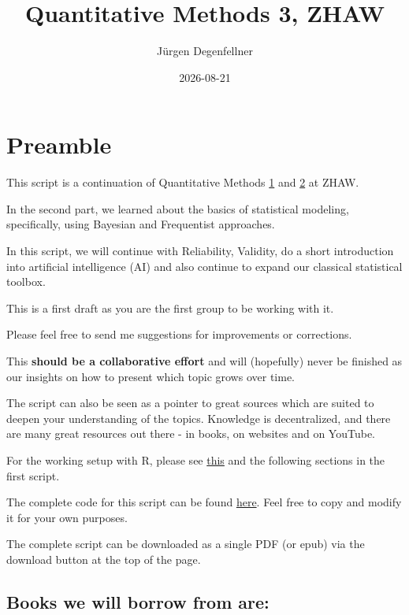 \documentclass[
]{book}
\title{Quantitative Methods 3, ZHAW}
\author{Jürgen Degenfellner}
\date{2026-08-21}
\begin{document}
\maketitle

{
\setcounter{tocdepth}{1}
\tableofcontents
}
\chapter{Preamble}\label{intro0}

This script is a continuation of Quantitative Methods
\href{https://jdegenfellner.github.io/Script_QM1_ZHAW/}{1} and
\href{https://jdegenfellner.github.io/Script_QM2_ZHAW/}{2} at ZHAW.

In the second part, we learned about the basics of statistical modeling,
specifically, using Bayesian and Frequentist approaches.

In this script, we will continue with Reliability, Validity, do a short introduction
into artificial intelligence (AI) and also continue to expand our classical
statistical toolbox.

This is a first draft as you are the first group to be working with it.

Please feel free to send me suggestions for improvements or corrections.

This \textbf{should be a collaborative effort} and will (hopefully)
never be finished as our insights on how to present which topic grows over time.

The script can also be seen as a pointer to great sources which are
suited to deepen your understanding of the topics. Knowledge is decentralized,
and there are many great resources out there - in books, on websites and on YouTube.

For the working setup with R, please
see \href{https://jdegenfellner.github.io/Script_QM1_ZHAW/index.html\#section}{this}
and the following sections in the first script.

The complete code for this script can be found
\href{https://github.com/jdegenfellner/Script_QM3_ZHAW}{here}.
Feel free to copy and modify it for your own purposes.

The complete script can be downloaded as a single PDF (or epub) via the
download button at the top of the page.

\section{Books we will borrow from are:}\label{books-we-will-borrow-from-are}
\end{document}
